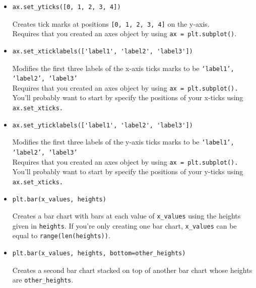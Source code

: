 \documentclass[a4paper]{article}
\begin{document}
\begin{itemize}
\item
\begin{lstlisting}
ax.set_yticks([0, 1, 2, 3, 4])
\end{lstlisting}
Creates tick marks at positions \texttt{[0, 1, 2, 3, 4]}
on the y-axis. \\
Requires that you created an axes object by using
\texttt{ax = plt.subplot()}.

\item
\begin{lstlisting}
ax.set_xticklabels(['label1', 'label2', 'label3'])
\end{lstlisting}
Modifies the first three labels of the x-axis ticks marks
to be  \texttt{‘label1’, ‘label2’, ‘label3’} \\
Requires that you created an axes object by using
\texttt{ax = plt.subplot().} \\
You’ll probably want to start by specify the positions
of your x-ticks using  \texttt{ax.set\_xticks.}

\item
\begin{lstlisting}
ax.set_yticklabels(['label1', 'label2', 'label3'])
\end{lstlisting}
Modifies the first three labels of the y-axis ticks marks
to be  \texttt{‘label1’, ‘label2’, ‘label3’} \\
Requires that you created an axes object by using
\texttt{ax = plt.subplot().} \\
You’ll probably want to start by specify the positions
of your y-ticks using  \texttt{ax.set\_xticks.}

\item
\begin{lstlisting}
plt.bar(x_values, heights)
\end{lstlisting}
Creates a bar chart with bars at each value of
\texttt{x\_values} using the heights given in \texttt{heights}.
If you’re only creating one bar chart, \texttt{x\_values} can
be equal to \texttt{range(len(heights))}.

\item
\begin{lstlisting}
plt.bar(x_values, heights, bottom=other_heights)
\end{lstlisting}
Creates a second bar chart stacked on top of another
bar chart whose heights are  \texttt{other\_heights}.

\end{itemize}
\end{document}
